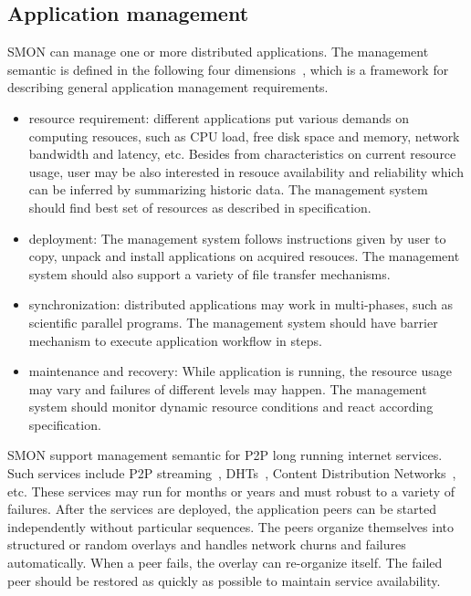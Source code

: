 \subsection{Application management}

SMON can manage one or more distributed applications. The
management semantic is defined in the following four
dimensions~\cite{plush?}, which is a framework for
describing general application management requirements.

\begin{itemize}

  \item resource requirement: different applications put
  various demands on computing resouces, such as CPU load,
  free disk space and memory, network bandwidth and latency,
  etc. Besides from characteristics on current resource
  usage, user may be also interested in resouce availability
  and reliability which can be inferred by summarizing
  historic data. The management system should find best set
  of resources as described in specification.

  \item deployment: The management system follows
  instructions given by user to copy, unpack and install
  applications on acquired resouces. The management system
  should also support a variety of file transfer mechanisms.

  \item synchronization: distributed applications may work
  in multi-phases, such as scientific parallel programs.
  The management system should have barrier mechanism to
  execute application workflow in steps.

  \item maintenance and recovery: While application is running,
  the resource usage may vary and failures of different
  levels may happen. The management system should monitor
  dynamic resource conditions and react according
  specification.

\end{itemize}

SMON support management semantic for P2P long running
internet services. Such services include P2P
streaming~\cite{xxx}, DHTs~\cite{xxx}, Content Distribution
Networks~\cite{xxx}, etc. These services may run for months
or years and must robust to a variety of failures. After the
services are deployed, the application peers can be
started independently without particular sequences. The
peers organize themselves into structured or random overlays
and handles network churns and failures automatically. When
a peer fails, the overlay can re-organize itself. The failed
peer should be restored as quickly as possible to maintain
service availability.

